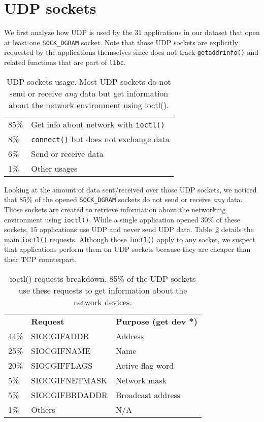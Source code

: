 \section{UDP sockets}\label{sec:udp}

We first analyze how UDP is used by the 31 applications in our dataset that
open at least one \texttt{SOCK\_DGRAM} socket. Note that those UDP sockets are
explicitly requested by the applications themselves since \tcpsnitch does not
track \texttt{getaddrinfo()} and related functions that are part of
\texttt{libc}.

\begin{table}[]
\centering
\begin{tabular}{ll}
85\% & Get info about network with \texttt{ioctl()} \\
8\% & \texttt{connect()} but does not exchange data \\
6\% & Send or receive data \\
1\% & Other usages
\end{tabular}
\caption{UDP sockets usage. \textmd{Most UDP sockets do not send or receive 
\emph{any} data but get information about the network environment using ioctl().}}
\label{tab:udp_sockets_usage}
\end{table}

Looking at the amount of data sent/received over those UDP sockets, we
noticed that 85\% of the opened \texttt{SOCK\_DGRAM}
sockets do not send or receive \emph{any} data. Those sockets are
created to retrieve information about the networking environment using
\texttt{ioctl()}. While a single application opened 30\% of these
sockets, 15 applications use UDP and never send UDP data.
Table~\ref{fig:udp_ioctls} details the main \texttt{ioctl()}
requests. Although those \texttt{ioctl()} apply to any socket, we
suspect that applications perform them on UDP sockets because they are
cheaper than their TCP counterpart.

\begin{table}[]
    \centering
    \begin{tabular}{lll}
        \textbf{} & \textbf{Request} & \textbf{Purpose (get dev *)}      \\
        44\%   & SIOCGIFADDR      & Address                   \\
        25\%   & SIOCGIFNAME      & Name                      \\
        20\%   & SIOCGIFFLAGS     & Active flag word          \\
        5\%    & SIOCGIFNETMASK   & Network mask              \\
        5\%    & SIOCGIFBRDADDR   & Broadcast address         \\
        1\%    & Others           & N/A
    \end{tabular}
    \caption{ioctl() requests breakdown. 85\% of the UDP sockets use these
    requests to get information about the network devices.}
    \label{fig:udp_ioctls}
\end{table}


